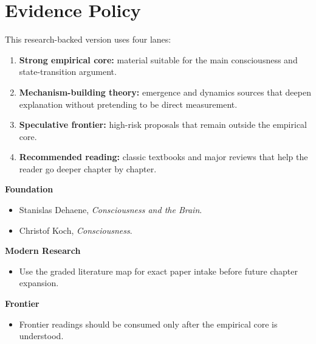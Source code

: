 \section{Evidence Policy}

This research-backed version uses four lanes:
\begin{enumerate}[nosep]
  \item \textbf{Strong empirical core:} material suitable for the main
        consciousness and state-transition argument.
  \item \textbf{Mechanism-building theory:} emergence and dynamics sources that
        deepen explanation without pretending to be direct measurement.
  \item \textbf{Speculative frontier:} high-risk proposals that remain outside
        the empirical core.
  \item \textbf{Recommended reading:} classic textbooks and major reviews that
        help the reader go deeper chapter by chapter.
\end{enumerate}

\begin{readingbox}
\textbf{Foundation}
\begin{itemize}[nosep]
  \item Stanislas Dehaene, \emph{Consciousness and the Brain}.
  \item Christof Koch, \emph{Consciousness}.
\end{itemize}
\textbf{Modern Research}
\begin{itemize}[nosep]
  \item Use the graded literature map for exact paper intake before future
        chapter expansion.
\end{itemize}
\textbf{Frontier}
\begin{itemize}[nosep]
  \item Frontier readings should be consumed only after the empirical core is
        understood.
\end{itemize}
\end{readingbox}
